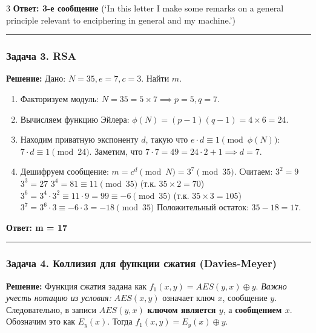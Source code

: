 ﻿\documentclass[9pt,a4paper,landscape]{extarticle}
\newcommand{\tightlist}{}
\begin{document}
\begin{multicols*}{3}
\textbf{Ответ: 3-е сообщение} (`In this letter I make some remarks on a general principle relevant to enciphering in general and my machine.')

\begin{center}\rule{0.5\linewidth}{0.5pt}\end{center}

\subsubsection{Задача 3. RSA}\label{ux437ux430ux434ux430ux447ux430-3.-rsa}

\textbf{Решение:} Дано: \(N=35, e=7, c=3\). Найти \(m\).

\begin{enumerate}
\def\labelenumi{\arabic{enumi}.}
\tightlist
\item
  Факторизуем модуль: \(N = 35 = 5 \times 7 \implies p=5, q=7\).
\item
  Вычисляем функцию Эйлера: \(\phi(N) = (p-1)(q-1) = 4 \times 6 = 24\).
\item
  Находим приватную экспоненту \(d\), такую что \(e \cdot d \equiv 1 \pmod{\phi(N)}\): \(7 \cdot d \equiv 1 \pmod{24}\). Заметим, что \(7 \cdot 7 = 49 = 24 \cdot 2 + 1 \implies d = 7\).
\item
  Дешифруем сообщение: \(m = c^d \pmod N = 3^7 \pmod{35}\). Считаем: \(3^2 = 9\) \(3^3 = 27\) \(3^4 = 81 \equiv 11 \pmod{35}\) (т.к. \(35 \times 2 = 70\)) \(3^6 = 3^4 \cdot 3^2 \equiv 11 \cdot 9 = 99 \equiv -6 \pmod{35}\) (т.к. \(35 \times 3 = 105\)) \(3^7 = 3^6 \cdot 3 \equiv -6 \cdot 3 = -18 \pmod{35}\) Положительный остаток: \(35 - 18 = 17\).
\end{enumerate}

\textbf{Ответ: m = 17}

\begin{center}\rule{0.5\linewidth}{0.5pt}\end{center}

\subsubsection{Задача 4. Коллизия для функции сжатия (Davies-Meyer)}\label{ux437ux430ux434ux430ux447ux430-4.-ux43aux43eux43bux43bux438ux437ux438ux44f-ux434ux43bux44f-ux444ux443ux43dux43aux446ux438ux438-ux441ux436ux430ux442ux438ux44f-davies-meyer}

\textbf{Решение:} Функция сжатия задана как \(f_1(x,y) = AES(y,x) \oplus y\). \emph{Важно учесть нотацию из условия:} \(AES(x,y)\) означает ключ \(x\), сообщение \(y\). Следовательно, в записи \(AES(y,x)\) \textbf{ключом является \(y\)}, а \textbf{сообщением \(x\)}. Обозначим это как \(E_y(x)\). Тогда \(f_1(x,y) = E_y(x) \oplus y\).


\end{multicols*}
\end{document}
